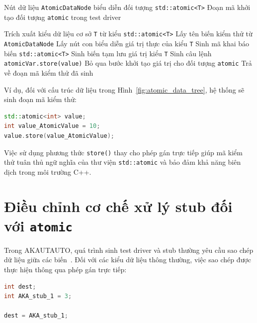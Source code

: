\begin{algorithm}[H]
\caption{Sinh mã kiểm thử cho đối tượng \texttt{std::atomic}}
\label{alg:atomic-driver-generation}
\begin{algorithmic}[1]
\Require Nút dữ liệu \texttt{AtomicDataNode} biểu diễn đối tượng \texttt{std::atomic<T>}
\Ensure Đoạn mã khởi tạo đối tượng \texttt{atomic} trong test driver

\State Trích xuất kiểu dữ liệu cơ sở \texttt{T} từ kiểu \texttt{std::atomic<T>}
\State Lấy tên biến kiểm thử từ \texttt{AtomicDataNode}
\State Lấy nút con biểu diễn giá trị thực của kiểu \texttt{T}
\State Sinh mã khai báo biến \texttt{std::atomic<T>}
    \State Sinh biến tạm lưu giá trị kiểu \texttt{T}
    \State Sinh câu lệnh \texttt{atomicVar.store(value)}
\Else
    \State Bỏ qua bước khởi tạo giá trị cho đối tượng \texttt{atomic}
\EndIf
\State Trả về đoạn mã kiểm thử đã sinh
\end{algorithmic}
\end{algorithm}

Ví dụ, đối với cấu trúc dữ liệu trong Hình~\ref{fig:atomic_data_tree}, hệ thống sẽ sinh đoạn mã kiểm thử:

\begin{lstlisting}[language=C++,caption={Ví dụ khai báo đối tượng std::atomic trong test driver},label={lst:std_atomic_example}]
std::atomic<int> value;
int value_AtomicValue = 10;
value.store(value_AtomicValue);
\end{lstlisting}

Việc sử dụng phương thức \texttt{store()} thay cho phép gán trực tiếp giúp mã kiểm thử tuân thủ ngữ nghĩa của thư viện \texttt{std::atomic} và bảo đảm khả năng biên dịch trong môi trường C++.

\section{Điều chỉnh cơ chế xử lý stub đối với \texttt{atomic}}

Trong AKAUTAUTO, quá trình sinh test driver và stub thường yêu cầu sao chép dữ liệu giữa các biến~\cite{trannguyenhuong2022stub}. Đối với các kiểu dữ liệu thông thường, việc sao chép được thực hiện thông qua phép gán trực tiếp:

\begin{lstlisting}[language=C++,caption={Ví dụ khai báo đối tượng stub},label={lst:stub_example}]
int dest;
int AKA_stub_1 = 3;

dest = AKA_stub_1;
\end{lstlisting}

